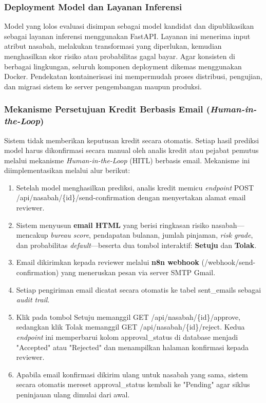 \subsubsection{Deployment Model dan Layanan Inferensi}
Model yang lolos evaluasi disimpan sebagai model kandidat dan dipublikasikan sebagai layanan inferensi menggunakan FastAPI. Layanan ini menerima input atribut nasabah, melakukan transformasi yang diperlukan, kemudian menghasilkan skor risiko atau probabilitas gagal bayar. Agar konsisten di berbagai lingkungan, seluruh komponen deployment dikemas menggunakan Docker. Pendekatan kontainerisasi ini mempermudah proses distribusi, pengujian, dan migrasi sistem ke server pengembangan maupun produksi.


\subsubsection{Mekanisme Persetujuan Kredit Berbasis Email (\textit{Human-in-the-Loop})}

Sistem tidak memberikan keputusan kredit secara otomatis. Setiap hasil prediksi model harus dikonfirmasi secara manual oleh analis kredit atau pejabat pemutus melalui mekanisme \textit{Human-in-the-Loop} (HITL) berbasis email. Mekanisme ini diimplementasikan melalui alur berikut:

\begin{enumerate}
    \item Setelah model menghasilkan prediksi, analis kredit memicu \textit{endpoint} POST /api/\allowbreak nasabah/\allowbreak\{id\}/\allowbreak send-confirmation dengan menyertakan alamat email reviewer.
    \item Sistem menyusun \textbf{email HTML} yang berisi ringkasan risiko nasabah---mencakup \textit{bureau score}, pendapatan bulanan, jumlah pinjaman, \textit{risk grade}, dan probabilitas \textit{default}---beserta dua tombol interaktif: \textbf{Setuju} dan \textbf{Tolak}.
    \item Email dikirimkan kepada reviewer melalui \textbf{n8n webhook} (/webhook/send-confirmation) yang meneruskan pesan via server SMTP Gmail.
    \item Setiap pengiriman email dicatat secara otomatis ke tabel sent\_emails sebagai \textit{audit trail}.
    \item Klik pada tombol Setuju memanggil GET /api/nasabah/\{id\}/approve, sedangkan klik Tolak memanggil GET /api/nasabah/\{id\}/reject. Kedua \textit{endpoint} ini memperbarui kolom approval\_status di database menjadi "Accepted" atau "Rejected" dan menampilkan halaman konfirmasi kepada reviewer.
    \item Apabila email konfirmasi dikirim ulang untuk nasabah yang sama, sistem secara otomatis mereset approval\_status kembali ke "Pending" agar siklus peninjauan ulang dimulai dari awal.
\end{enumerate}

